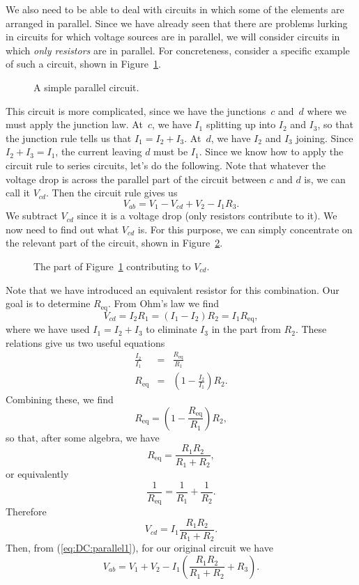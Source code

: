 We also need to be able to deal with circuits in which some of the elements are
arranged in parallel. Since we have already seen that there are problems 
lurking in circuits for which voltage sources are in parallel, we will consider
circuits in which {\it only resistors} are in parallel. For concreteness, 
consider a specific example of such a circuit, shown in 
Figure~\ref{fig:DC:parallel1}.
\begin{figure}[htb]
\centerline{\epsfxsize=12cm }
\caption{A simple parallel circuit.}
\label{fig:DC:parallel1}
\end{figure}
This circuit is more complicated, since we have the junctions~$c$ and~$d$ where
we must apply the junction law. At~$c$, we have $I_1$ splitting up into $I_2$ 
and $I_3$, so that the junction rule tells us that $I_1=I_2+I_3$. At~$d$, we 
have $I_2$ and $I_3$ joining. Since $I_2+I_3=I_1$, the current leaving $d$ 
must be $I_1$.  Since we know how to apply the circuit rule to series circuits,
let's do the following. Note that whatever the voltage drop is across the 
parallel part of the circuit between $c$ and $d$ is, we can call it $V_{cd}$. 
Then the circuit rule gives us
\begin{equation}
V_{ab}= V_1 - V_{cd} + V_2 - I_1R_3.  \label{eq:DC:parallel1}
\end{equation}
We subtract $V_{cd}$ since it is a voltage drop (only resistors contribute to 
it).  We now need to find out what $V_{cd}$ is.  For this purpose, we can 
simply concentrate on the relevant part of the circuit, shown in 
Figure~\ref{fig:DC:parallel2}.
\begin{figure}
\centerline{\epsfxsize=10cm }
\caption{The part of Figure~\ref{fig:DC:parallel1} contributing to $V_{cd}$.}
\label{fig:DC:parallel2}
\end{figure}
Note that we have introduced an equivalent resistor for this combination. Our
goal is to determine $R_{\mbox{eq}}$. From Ohm's law we find
$$
V_{cd}=I_2R_1=(I_1-I_2)R_2=I_1R_{\mbox{eq}},
$$
where we have used $I_1=I_2+I_3$ to eliminate $I_3$ in the part from $R_2$.
These relations give us two useful equations
\begin{eqnarray*}
\frac{I_2}{I_1} &=& \frac{R_{\mbox{eq}}}{R_1} \\
R_{\mbox{eq}} &=& \left(1-\frac{I_2}{I_1}\right) R_2.
\end{eqnarray*}
Combining these, we find
$$
R_{\mbox{eq}} = \left(1- \frac{R_{\mbox{eq}}}{R_1} \right) R_2,
$$
so that, after some algebra, we have
$$
R_{\mbox{eq}} = \frac{R_1R_2}{R_1+R_2},
$$
or equivalently
\begin{equation}
\frac{1}{R_{\mbox{eq}}} = \frac{1}{R_1}+\frac{1}{R_2}.
\label{eq:DC:twoparallel}
\end{equation}
Therefore 
$$
V_{cd} = I_1 \frac{R_1R_2}{R_1+R_2}. 
$$
Then, from (\ref{eq:DC:parallel1}), for our original circuit we have
$$
V_{ab} = V_1+V_2- I_1 \left( \frac{R_1R_2}{R_1+R_2} +R_3 \right).
$$ 

